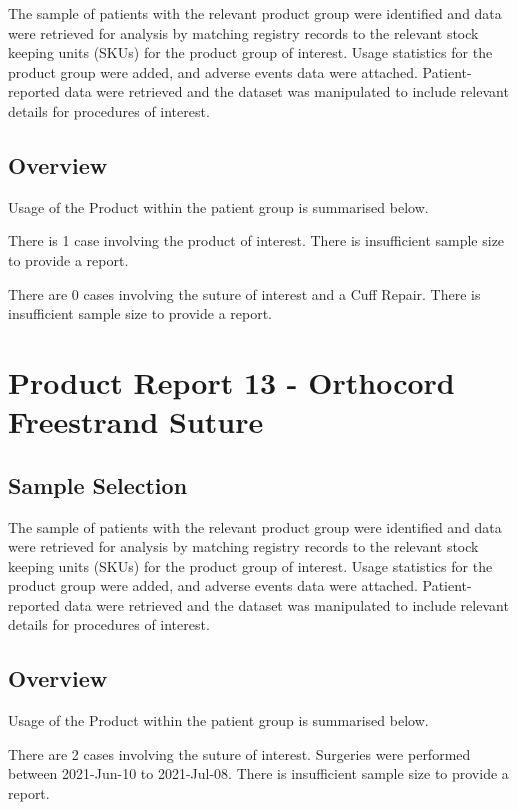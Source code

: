 \documentclass[
]{article}
\begin{document}
The sample of patients with the relevant product group were identified
and data were retrieved for analysis by matching registry records to the
relevant stock keeping units (SKUs) for the product group of interest.
Usage statistics for the product group were added, and adverse events
data were attached. Patient-reported data were retrieved and the dataset
was manipulated to include relevant details for procedures of interest.

\subsection{Overview}\label{overview-11}

Usage of the Product within the patient group is summarised below.

There is 1 case involving the product of interest. There is insufficient
sample size to provide a report.

There are 0 cases involving the suture of interest and a Cuff Repair.
There is insufficient sample size to provide a report.

\section{Product Report 13 - Orthocord Freestrand
Suture}\label{product-report-13---orthocord-freestrand-suture}

\subsection{Sample Selection}\label{sample-selection-12}

The sample of patients with the relevant product group were identified
and data were retrieved for analysis by matching registry records to the
relevant stock keeping units (SKUs) for the product group of interest.
Usage statistics for the product group were added, and adverse events
data were attached. Patient-reported data were retrieved and the dataset
was manipulated to include relevant details for procedures of interest.

\subsection{Overview}\label{overview-12}

Usage of the Product within the patient group is summarised below.

There are 2 cases involving the suture of interest. Surgeries were
performed between 2021-Jun-10 to 2021-Jul-08. There is insufficient
sample size to provide a report.
\end{document}
